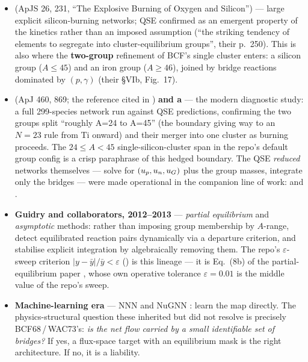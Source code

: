 \begin{itemize}
\item \textbf{\citet{wac1973}} (ApJS 26, 231, ``The Explosive Burning of Oxygen
  and Silicon'') --- large explicit silicon-burning networks; QSE confirmed as
  an emergent property of the kinetics rather than an imposed assumption (``the
  striking tendency of elements to segregate into cluster-equilibrium groups'',
  their p.~250). This is also where the \textbf{two-group} refinement of BCF's
  single cluster enters: a silicon group ($A \le 45$) and an iron group
  ($A \ge 46$), joined by bridge reactions dominated by
  $(p,\gamma)$ (their \S VIb, Fig.~17).

\item \textbf{\citet{ht1996}} (ApJ 460, 869; the reference cited in
  ) \textbf{and \citeyear{ht1999a}a}
  \citep[ApJ 511, 862;][]{ht1999a} --- the modern diagnostic study: a full
  299-species network run against QSE predictions, confirming the two groups
  split ``roughly A=24 to A=45'' (the boundary giving way to an $N = 23$ rule
  from Ti onward) and their merger into one cluster as burning proceeds. The
  $24 \le A < 45$ single-silicon-cluster span in the repo's default group config
  is a crisp paraphrase of this hedged boundary. The QSE \emph{reduced} networks
  themselves --- solve for $(u_{p}, u_{n}, u_{G})$ plus the group masses, integrate
  only the bridges --- were made operational in the companion line of work:
  \citet{hix1998} and \citet{hix2007}.

\item \textbf{Guidry and collaborators, 2012--2013} \citep{guidry2012,
  guidry2013pe, guidry2013asym, guidry2013qss} --- \emph{partial equilibrium}
  and \emph{asymptotic} methods: rather than imposing group membership by
  $A$-range, detect equilibrated reaction pairs dynamically via a departure
  criterion, and stabilise explicit integration by algebraically removing them.
  The repo's $\varepsilon$-sweep criterion $|y - \bar y|/\bar y < \varepsilon$
  () is this lineage --- it is Eq.~(8b) of
  the partial-equilibrium paper \citep{guidry2013pe}, whose own operative
  tolerance $\varepsilon = 0.01$ is the middle value of the repo's sweep.

\item \textbf{Machine-learning era} --- NNN \citep{grichener2025} and NuGNN
  \citep{kim2026}: learn the map directly. The physics-structural question these
  inherited but did not resolve is precisely BCF68\,/\,WAC73's: \emph{is the net
  flow carried by a small identifiable set of bridges?} If yes, a flux-space
  target with an equilibrium mask is the right architecture. If no, it is a
  liability.
\end{itemize}

